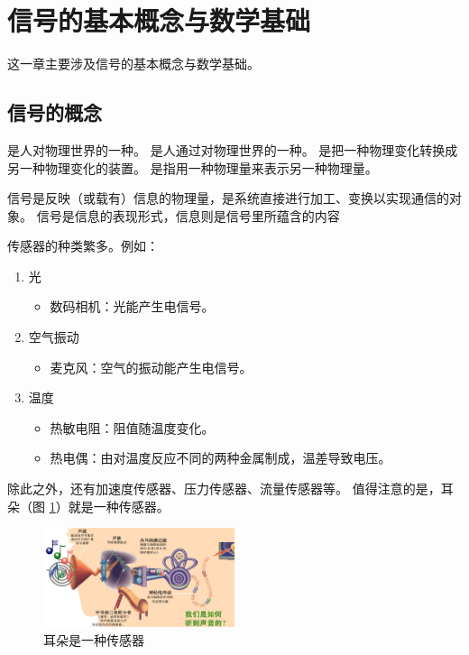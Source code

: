 \section{信号的基本概念与数学基础}

这一章主要涉及信号的基本概念与数学基础。

\subsection{信号的概念}

\begin{definition}[信号]
    是人对物理世界的一种。
    是人通过对物理世界的一种。
    是把一种物理变化转换成另一种物理变化的装置。
    是指用一种物理量来表示另一种物理量。

    信号是反映（或载有）信息的物理量，是系统直接进行加工、变换以实现通信的对象。
    信号是信息的表现形式，信息则是信号里所蕴含的内容
\end{definition}

\begin{example}[传感器]
    传感器的种类繁多。例如：
    \begin{enumerate}
        \item 光
            \begin{itemize}
                \item 数码相机：光能产生电信号。
            \end{itemize}
        \item 空气振动
            \begin{itemize}
                \item 麦克风：空气的振动能产生电信号。
            \end{itemize}
        \item 温度
            \begin{itemize}
                \item 热敏电阻：阻值随温度变化。
                \item 热电偶：由对温度反应不同的两种金属制成，温差导致电压。
            \end{itemize}
    \end{enumerate}

    除此之外，还有加速度传感器、压力传感器、流量传感器等。
    值得注意的是，耳朵（图 \ref{fig:ear}）就是一种传感器。
    \begin{figure}[htbp]
        \centering
        \includegraphics[width=0.5\textwidth]{chap1/img/ear.png}
        \caption{耳朵是一种传感器}
        \label{fig:ear}
    \end{figure}
\end{example}

